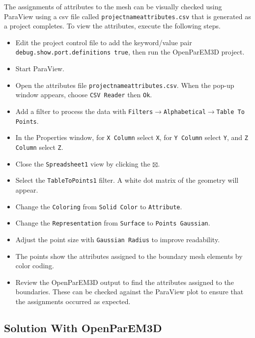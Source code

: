 \documentclass[titlepage]{article}
\renewcommand\_{\textunderscore\linebreak[1]}
\begin{document}
The assignments of attributes to the mesh can be visually checked using ParaView using a csv file called \texttt{projectname\_attributes.csv} that is generated as a project completes.  To view the attributes, execute the following steps.
\begin{itemize}
\item Edit the project control file to add the keyword/value pair \texttt{debug.show.port.definitions true}, then run the OpenParEM3D project.
\item Start ParaView.
\item Open the attributes file \texttt{projectname\_attributes.csv}. When the pop-up window appears, choose \texttt{CSV Reader} then \texttt{Ok}.
\item Add a filter to process the data with \texttt{Filters}$\rightarrow$\texttt{Alphabetical}$\rightarrow$\texttt{Table To Points}.
\item In the Properties window, for \texttt{X Column} select \texttt{X}, for \texttt{Y Column} select \texttt{Y}, and \texttt{Z Column} select \texttt{Z}.
\item Close the \texttt{Spreadsheet1} view by clicking the $\boxtimes$.
\item Select the \texttt{TableToPoints1} filter. A white dot matrix of the geometry will appear.
\item Change the \texttt{Coloring} from \texttt{Solid Color} to \texttt{Attribute}.
\item Change the \texttt{Representation} from \texttt{Surface} to \texttt{Points Gaussian}.
\item Adjust the point size with \texttt{Gaussian Radius} to improve readability.
\item The points show the attributes assigned to the boundary mesh elements by color coding.
\item Review the OpenParEM3D output to find the attributes assigned to the boundaries.  These can be checked against the ParaView plot to ensure that the assignments occurred as expected.
\end{itemize}
\subsection{Solution With OpenParEM3D}
\end{document}
